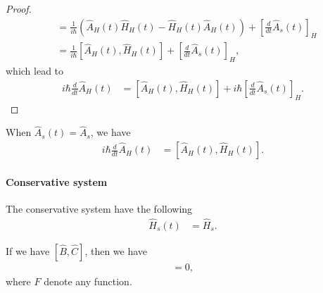 \documentclass[../../note.tex]{subfiles}
\begin{document}
\begin{proof}
\begin{align}
        &= \frac{1}{i \hbar} \left(\hat{A}_H(t) \hat{H}_H(t) - \hat{H}_H(t) \hat{A}_H(t) \right) + \left[\frac{d}{d t }\hat{A}_s(t)\right]_H \\
        &= \frac{1}{i \hbar} [\hat{A}_H(t), \hat{H}_H(t)]+ \left[\frac{d}{d t }\hat{A}_s(t)\right]_H,
    \end{align}
    which lead to
    \begin{align}
        i \hbar \frac{d}{d t} \hat{A}_H(t) 
        &= [\hat{A}_H(t), \hat{H}_H(t)] + i \hbar \left[\frac{d}{d t} \hat{A}_s(t) \right]_H.
    \end{align}
\end{proof}

\begin{corollary}
    When $\hat{A}_s(t) = \hat{A}_s$, we have
    \begin{align}
        i \hbar \frac{d}{d t} \hat{A}_H(t) 
        &= [\hat{A}_H(t), \hat{H}_H(t)].
    \end{align}
\end{corollary}

\paragraph{Conservative system}
\begin{definition}
    \label{def: conservative system}
    The conservative system have the following
    \begin{align}
        \hat{H}_s(t)
        &= \hat{H}_s.
    \end{align}
\end{definition}

\begin{lemma}
    \label{lemma: commutation relation}
    If we have $[\hat{B},\hat{C}]$, then we have
    \begin{align}
        [\hat{B}, F(\hat{C})] = 0,
    \end{align}
    where $F$ denote any function.
\end{lemma}
\end{document}

